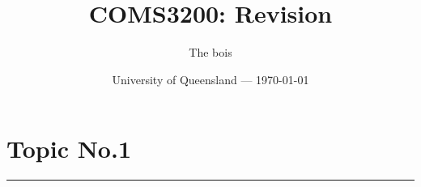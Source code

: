 \documentclass{article}
\title{COMS3200: Revision} %
\author{The bois}
\date{University of Queensland --- \today}
\begin{document}
\maketitle %

\section*{Topic No.1}
\noindent
\rule{\linewidth}{0.5mm}
\noindent
\end{document}
